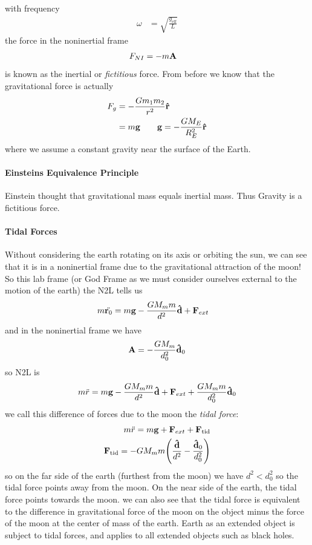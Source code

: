\documentclass[../main.tex]{subfiles}
\begin{document}
with frequency
\begin{align*}
    \omega &= \sqrt{\frac{g_{\text{eff}}}{L}}
\end{align*}
the force in the noninertial frame
\begin{align*}
    F_{NI} &= -m\vb A
\end{align*}
is known as the inertial or \emph{fictitious} force. From before we know that the gravitational force
is actually
\begin{align*}
    F_g &= -\frac{G m_1 m_2}{r^2} \vu r \\
    &= m \vb g \qquad \vb g = - \frac{GM_E}{R_E^2} \vu r
\end{align*}
where we assume a constant gravity near the surface of the Earth.

\paragraph*{Einsteins Equivalence Principle} Einstein thought that gravitational mass equals
inertial mass. Thus Gravity is a fictitious force.

\paragraph*{Tidal Forces} Without considering the earth rotating on its axis or orbiting the sun, we
can see that it is in a noninertial frame due to the gravitational attraction of the moon! So this
lab frame (or God Frame as we must consider ourselves external to the motion of the earth) the 
N2L tells us
\begin{align*}
    m \ddot{\vb r_0} &= m \vb g - \frac{G M_m m}{d^2} \vu d + \vb F_{ext}
\end{align*}
and in the noninertial frame we have
\begin{align*}
    \vb A = -\frac{G M_m}{d_0^2} \vu d_0
\end{align*}
so N2L is
\begin{align*}
    m\ddot r = m\vb g - \frac{G M_m m}{d^2} \vu d + \vb F_{ext} + \frac{G M_m m}{d_0^2} \vu d_0
\end{align*}
we call this difference of forces due to the moon the \emph{tidal force}:
\begin{align*}
    m\ddot r = m \vb g + \vb F_{ext} + \vb F_{\text{tid}} \\
    \vb F_{\text{tid}} = -GM_m m \qt(\frac{\vu d}{d^2} - \frac{\vu d_0}{d_0^2})
\end{align*}
so on the far side of the earth (furthest from the moon) we have $d^2 < d_0^2$ so the tidal force
points away from the moon. On the near side of the earth, the tidal force points towards the moon.
we can also see that the tidal force is equivalent to the difference in gravitational force of the
moon on the object minus the force of the moon at the center of mass of the earth. Earth as an
extended object is subject to tidal forces, and applies to all extended objects such as black holes.
\end{document}

